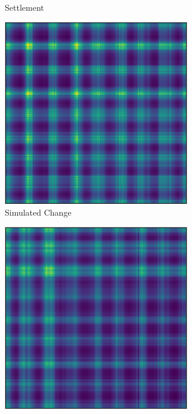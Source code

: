 \documentclass{article}
\begin{document}
\begin{figure}[h]
\begin{subfigure}[b]{0.5\linewidth}
    \caption{Settlement} 
    \label{fig7:b} 
    \vspace{6ex}
    \end{subfigure} 
  \begin{subfigure}[b]{0.5\linewidth}
    \centering
    \includegraphics[width=0.89\textwidth]{sim_c-crop.pdf} 
    \caption{Simulated Change} 
    \label{fig7:c} 
  \end{subfigure}%
  \begin{subfigure}[b]{0.5\linewidth}
    \centering
    \includegraphics[width=0.89\textwidth]{real_c-crop.pdf} 

\end{subfigure}
\end{figure}
\end{document}
